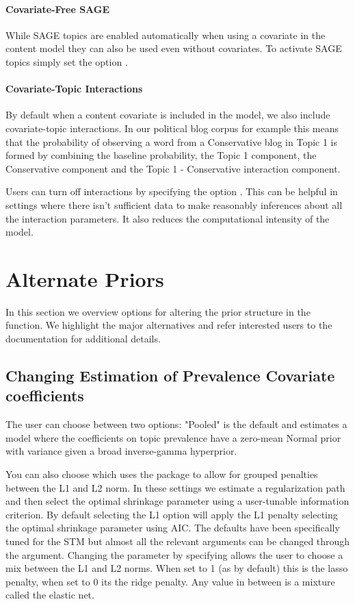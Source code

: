 \documentclass[nojss]{jss}
\begin{document}
\paragraph{Covariate-Free SAGE}
While SAGE topics are enabled automatically when using a covariate in the content model they can also be used even without covariates.  To activate SAGE topics simply set the option .

\paragraph{Covariate-Topic Interactions}
By default when a content covariate is included in the model, we also include covariate-topic interactions.  In our political blog corpus for example this means that the probability of observing a word from a Conservative blog in Topic 1 is formed by combining the baseline probability, the Topic 1 component, the Conservative component and the Topic 1 - Conservative interaction component.

Users can turn off interactions by specifying the option .  This can be helpful in settings where there isn't sufficient data to make reasonably inferences about all the interaction parameters.  It also reduces the computational intensity of the model.

\section{Alternate Priors}
In this section we overview options for altering the prior structure in the   function.  We highlight the major alternatives and refer interested users to the documentation for additional details.

\subsection{Changing Estimation of Prevalence Covariate coefficients}

The user can choose between two options: "Pooled" is the default and estimates a model where the coefficients on topic prevalence have a zero-mean Normal prior with variance given a broad
 inverse-gamma hyperprior.

You can also choose  which uses the  package \citep{friedman2010regularization} to allow for grouped penalties between the L1 and L2 norm. In these settings we estimate a regularization path and then select the optimal shrinkage parameter using a user-tunable information criterion. By default selecting the L1 option will apply the L1 penalty selecting the optimal shrinkage parameter using AIC. The defaults have been specifically tuned for the STM but almost all the relevant arguments can be changed through the  argument. Changing the  parameter by specifying  allows the user to choose a mix between the L1 and L2 norms. When set to 1 (as by default) this is the lasso penalty, when set to 0 its the ridge penalty. Any value in between is a mixture called the elastic net.
\end{document}
